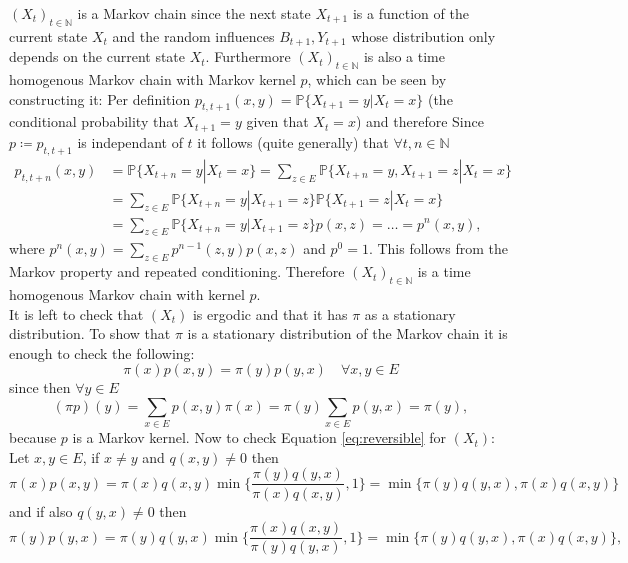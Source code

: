 \documentclass[a4paper]{article}
\begin{document}
$(X_t)_{t \in \mathbb{N}}$ is a Markov chain since the next state $X_{t+1}$ is a function of the current state $X_t$ and the random influences $B_{t+1},Y_{t+1}$ whose distribution only depends on the current state $X_t$.
Furthermore $(X_t)_{t \in \mathbb{N}}$ is also a time homogenous Markov chain with Markov kernel $p$, which can be seen by
constructing it: Per definition $p_{t,t+1}(x,y) = \mathbb{P}\{X_{t+1} = y | X_{t} = x\}$ (the conditional probability that $X_{t+1}=y$ given that $X_{t}= x$)
and therefore
Since $p \coloneq p_{t,t+1}$ is independant of $t$ it follows (quite generally) that $\forall t,n \in \mathbb{N}$
\begin{align*}
    p_{t,t+n}(x,y) &=\mathbb{P}\{X_{t+n} = y | X_{t} = x\}
    = \sum_{z \in E} \mathbb{P}\{ X_{t+n} = y, X_{t+1} = z | X_{t} = x \}\\
    &= \sum_{z \in E} \mathbb{P}\{ X_{t+n} = y | X_{t+1} = z \} \mathbb{P} \{ X_{t+1} =z | X_t =x\} \\
    &= \sum_{z \in E} \mathbb{P}\{ X_{t+n} = y | X_{t+1} = z \} p(x,z) = \dots = p^n(x,y),
\end{align*}
where $p^n(x,y) = \sum_{z \in E} p^{n-1}(z,y) p(x,z)$ and $p^0 = 1$.
This follows from the Markov property and repeated conditioning.
Therefore $(X_t)_{t \in \mathbb{N}}$ is a time homogenous Markov chain with kernel $p$.\\
It is left to check that $(X_t)$ is ergodic and that it has $\pi$ as a stationary distribution.
To show that $\pi$ is a stationary distribution of the Markov chain it is enough to check the following:
\begin{equation}
    \label{eq:reversible}
    \pi(x) p(x,y) =\pi(y)p(y,x) \quad \forall x,y \in E
\end{equation}
since then $\forall y \in E$
\begin{equation*}
    (\pi p)(y) = \sum_{x \in E} p(x,y) \pi (x) =\pi (y) \sum_{x \in E} p(y,x)  = \pi (y),
\end{equation*}
because $p$ is a Markov kernel.
Now to check Equation \ref{eq:reversible} for $(X_t)$:
Let $x,y \in E$, if $x \neq y$ and $q(x,y) \neq 0$ then
\begin{equation*}
    \pi(x) p(x,y) = \pi (x) q(x,y) \min \bigg \{ \frac{\pi (y) q(y , x)}{ \pi (x) q(x, y)}, 1 \bigg \}
    = \min \big \{  \pi(y) q(y,x), \pi(x) q(x,y) \big \}
\end{equation*}
and if also $q(y,x) \neq 0$ then
\begin{equation*}
    \pi(y) p(y,x) 
    = \pi(y) q(y,x) \min \bigg \{ \frac{\pi (x) q(x , y)}{ \pi (y) q(y, x)}, 1 \bigg \}
    = \min \big \{  \pi(y) q(y,x), \pi(x) q(x,y) \big \},
\end{equation*}
\end{document}

